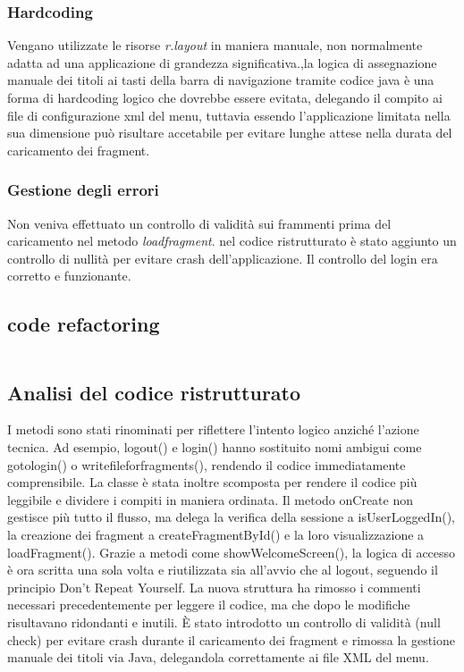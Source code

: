 \subsubsection{Hardcoding}
Vengano utilizzate le risorse \textit{r.layout} in maniera manuale, non normalmente adatta ad una applicazione di grandezza significativa.,la logica di assegnazione manuale dei titoli ai tasti della barra di navigazione tramite codice java è una forma di hardcoding logico che dovrebbe essere evitata, delegando il compito ai file di configurazione xml del menu, tuttavia essendo l'applicazione limitata nella sua dimensione può risultare accetabile per evitare lunghe attese nella durata del caricamento dei fragment.

\subsubsection{Gestione degli errori}
Non veniva effettuato un controllo di validità sui frammenti prima del caricamento nel metodo \textit{loadfragment}. nel codice ristrutturato è stato aggiunto un controllo di nullità per evitare crash dell'applicazione. 
Il controllo del login era corretto e funzionante.

\subsection{code refactoring}
\begin{verbatim}

\end{verbatim}

\subsection{Analisi del codice ristrutturato}
\begin{itemize}
I metodi sono stati rinominati per riflettere l'intento logico anziché l'azione tecnica. Ad esempio, logout() e login() hanno sostituito nomi ambigui come gotologin() o writefileforfragments(), rendendo il codice immediatamente comprensibile.
 La classe è stata inoltre scomposta per rendere il codice più leggibile e dividere i compiti in maniera ordinata. Il metodo onCreate non gestisce più tutto il flusso, ma delega la verifica della sessione a isUserLoggedIn(), la creazione dei fragment a createFragmentById() e la loro visualizzazione a loadFragment().
Grazie a metodi come showWelcomeScreen(), la logica di accesso è ora scritta una sola volta e riutilizzata sia all'avvio che al logout, seguendo il principio Don't Repeat Yourself.
 La nuova struttura ha rimosso i commenti necessari precedentemente per leggere il codice, ma che dopo le modifiche risultavano ridondanti e inutili.
È stato introdotto un controllo di validità (null check) per evitare crash durante il caricamento dei fragment e rimossa la gestione manuale dei titoli via Java, delegandola correttamente ai file XML del menu.
\end{itemize}